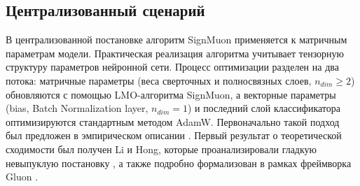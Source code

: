 \documentclass{article}
\begin{document}
\subsection{Централизованный сценарий}
В централизованной постановке алгоритм SignMuon применяется к матричным параметрам модели. Практическая реализация алгоритма учитывает тензорную структуру параметров нейронной сети. Процесс оптимизации разделен на два потока: матричные параметры (веса сверточных и полносвязных слоев, $n_{dim} \ge 2$) обновляются с помощью LMO-алгоритма SignMuon, а векторные параметры (bias, Batch Normalization layer, $n_{dim} = 1$) и последний слой классификатора оптимизируются стандартным методом AdamW. Первоначально такой подход был предложен в эмпирическом описании \cite{jordan2024muon}. Первый результат о теоретической сходимости был получен Li и Hong, которые проанализировали гладкую невыпуклую постановку \cite{li2025note}, а также подробно формализован в рамках фреймворка Gluon \cite{riabinin2025gluon}.
\end{document}
